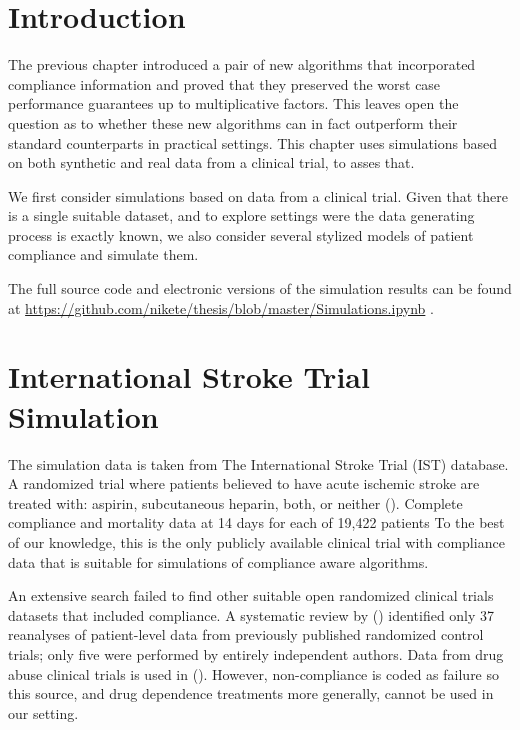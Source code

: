 
\section{Introduction}

The previous chapter introduced a pair of new algorithms that incorporated compliance information and proved that they preserved the worst case performance guarantees up to multiplicative factors.
This leaves open the question as to whether these new algorithms can in fact outperform their standard counterparts in practical settings. 
This chapter uses simulations based on both synthetic and real data from a clinical trial, to asses that.

We first consider simulations based on data from a clinical trial. Given that there is a single suitable dataset, and to explore settings were the data generating process is exactly known, we also consider several stylized models of patient compliance and simulate them.

The full source code and electronic versions of the simulation results can be found at \url{https://github.com/nikete/thesis/blob/master/Simulations.ipynb} .

\section{International Stroke Trial Simulation}
\label{sec:data}

The simulation data is taken from The International Stroke Trial (IST) database. A randomized trial where patients believed to have acute ischemic stroke are treated with: aspirin, subcutaneous heparin, both, or neither (\cite{ist:97}).
Complete compliance and mortality data at 14 days for each of 19,422 patients
To the best of our knowledge, this is the only publicly available clinical trial with compliance data that is suitable for simulations of compliance aware algorithms.

An extensive search failed to find other suitable open randomized clinical trials datasets that included compliance. A systematic review by  (\cite{ebrahim:14}) identified only 37 reanalyses of patient-level data from previously published randomized control trials; only five were performed by entirely independent authors.
Data from drug abuse clinical trials is used in (\cite{kuleshov:14}). However, non-compliance is coded as failure so this source, and drug dependence treatments more generally, cannot be used in our setting.  

